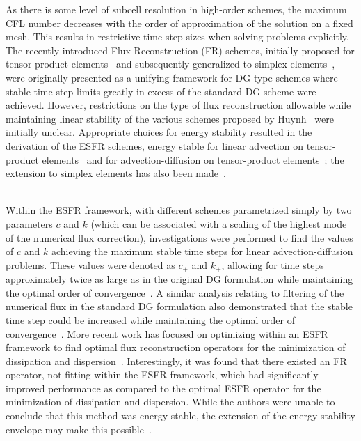 \documentclass[12pt,Bold,letterpaper,TexShade]{mcgilletdclass}
\numberwithin{equation}{section}
\begin{document}
As there is some level of subcell resolution in high-order schemes, the maximum CFL number decreases with the order of approximation of the solution on a fixed mesh. This results in restrictive time step sizes when solving problems explicitly. The recently introduced Flux Reconstruction (FR) schemes, initially proposed for tensor-product elements~\cite{huynh2007} and subsequently generalized to simplex elements~\cite{wang2009}, were originally presented as a unifying framework for DG-type schemes where stable time step limits greatly in excess of the standard DG scheme were achieved. However, restrictions on the type of flux reconstruction allowable while maintaining linear stability of the various schemes proposed by Huynh~\cite{huynh2007} were initially unclear. Appropriate choices for energy stability resulted in the derivation of the ESFR schemes, energy stable for linear advection on tensor-product elements~\cite{vincent2011} and for advection-diffusion on tensor-product elements~\cite{castonguay2013}; the extension to simplex elements has also been made~\cite{castonguay2012,williams2013,williams2014a}.
\\~

Within the ESFR framework, with different schemes parametrized simply by two parameters $c$ and $k$ (which can be associated with a scaling of the highest mode of the numerical flux correction), investigations were performed to find the values of $c$ and $k$ achieving the maximum stable time steps for linear advection-diffusion problems. These values were denoted as $c_+$ and $k_+$, allowing for time steps approximately twice as large as in the original DG formulation while maintaining the optimal order of convergence~\cite{castonguay2013,castonguay2012,williams2013,williams2014a}. A similar analysis relating to filtering of the numerical flux in the standard DG formulation also demonstrated that the stable time step could be increased while maintaining the optimal order of convergence~\cite{chalmers2014}. More recent work has focused on optimizing within an ESFR framework to find optimal flux reconstruction operators for the minimization of dissipation and dispersion~\cite{asthana2014}. Interestingly, it was found that there existed an FR operator, not fitting within the ESFR framework, which had significantly improved performance as compared to the optimal ESFR operator for the minimization of dissipation and dispersion. While the authors were unable to conclude that this method was energy stable, the extension of the energy stability envelope may make this possible~\cite{vincent2015}.
\\~
\end{document}
